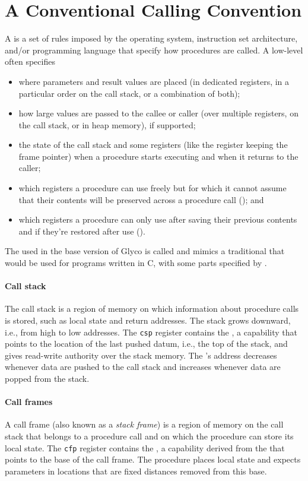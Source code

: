 \documentclass[main.tex]{subfiles}
\begin{document}
\section{A Conventional Calling Convention} \label{sct:cc}
A  is a set of rules imposed by the operating system, instruction set architecture, and/or programming language that specify how procedures are called. A low-level  often specifies
\begin{itemize}[noitemsep]
	\item where parameters and result values are placed (in dedicated registers, in a particular order on the call stack, or a combination of both);
	\item how large values are passed to the callee or caller (over multiple registers, on the call stack, or in heap memory), if supported;
	\item the state of the call stack and some registers (like the register keeping the frame pointer) when a procedure starts executing and when it returns to the caller;
	\item which registers a procedure can use freely but for which it cannot assume that their contents will be preserved across a procedure call (\textbf{}); and
	\item which registers a procedure can only use after saving their previous contents and if they're restored after use (\textbf{}).
\end{itemize}

The  used in the base version of Glyco is called \textbf{} and mimics a traditional  that would be used for programs written in C, with some parts specified by \cite[chapter~25]{riscv}.

\paragraph{Call stack} The call stack is a region of memory on which information about procedure calls is stored, such as local state and return addresses. The stack grows downward, i.e., from high to low addresses. The \texttt{csp} register contains the \textbf{}, a capability that points to the location of the last pushed datum, i.e., the top of the stack, and gives read-write authority over the stack memory. The 's address decreases whenever data are pushed to the call stack and increases whenever data are popped from the stack.

\paragraph{Call frames} A call frame (also known as a \emph{stack frame}) is a region of memory on the call stack that belongs to a procedure call and on which the procedure can store its local state. The \texttt{cfp} register contains the \textbf{}, a capability derived from the  that points to the base of the call frame. The procedure places local state and expects parameters in locations that are fixed distances removed from this base.
\end{document}
